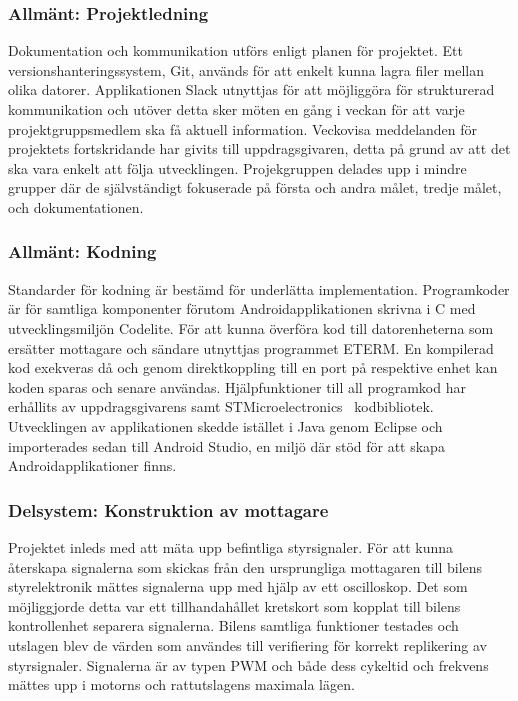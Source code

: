 \documentclass[a4paper]{article}
\begin{document}
\subsubsection{Allmänt: Projektledning}
Dokumentation och kommunikation utförs enligt planen för projektet. Ett versionshanteringssystem, Git, används för att enkelt kunna lagra filer mellan olika datorer. Applikationen Slack utnyttjas för att möjliggöra för strukturerad kommunikation och utöver detta sker möten en gång i veckan för att varje projektgruppsmedlem ska få aktuell information. Veckovisa meddelanden för projektets fortskridande har givits till uppdragsgivaren, detta på grund av att det ska vara enkelt att följa utvecklingen. Projekgruppen delades upp i mindre grupper där de självständigt fokuserade på första och andra målet, tredje målet, och dokumentationen.

\subsubsection{Allmänt: Kodning}
Standarder för kodning är bestämd för underlätta implementation. Programkoder är för samtliga komponenter förutom Androidapplikationen skrivna i C med utvecklingsmiljön Codelite.  För att kunna överföra kod till datorenheterna som ersätter mottagare och sändare utnyttjas programmet ETERM. En kompilerad kod exekveras då och genom direktkoppling till en port på respektive enhet kan koden sparas och senare användas. Hjälpfunktioner till all programkod har erhållits av uppdragsgivarens samt STMicroelectronics~\cite{STM} kodbibliotek. Utvecklingen av applikationen skedde istället i Java genom Eclipse och importerades sedan till Android Studio, en miljö där stöd för att skapa Androidapplikationer finns.




\subsubsection{Delsystem: Konstruktion av mottagare}
Projektet inleds med att mäta upp befintliga styrsignaler. För att kunna återskapa signalerna som skickas från den ursprungliga mottagaren till bilens styrelektronik mättes signalerna upp med hjälp av ett oscilloskop. Det som möjliggjorde detta var ett tillhandahållet kretskort som kopplat till bilens kontrollenhet separera signalerna. Bilens samtliga funktioner testades och utslagen blev de värden som användes till verifiering för korrekt replikering av styrsignaler. Signalerna är av typen PWM och både dess cykeltid och frekvens mättes upp i motorns och rattutslagens maximala lägen. 
\end{document}
